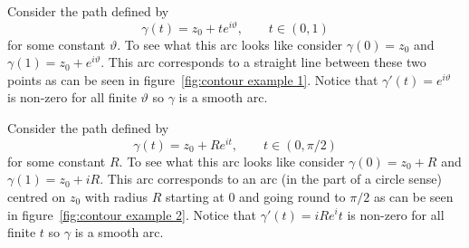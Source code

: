 \documentclass{article}
\begin{document}
    \begin{example}\label{exa:contours}
        Consider the path defined by
        \[\gamma(t) = z_0 + te^{i\vartheta}, \qquad t\in(0, 1)\]
        for some constant \(\vartheta\).
        To see what this arc looks like consider \(\gamma(0) = z_0\) and \(\gamma(1) = z_0 + e^{i\vartheta}\).
        This arc corresponds to a straight line between these two points as can be seen in figure~\ref{fig:contour example 1}.
        Notice that \(\gamma'(t) = e^{i\vartheta}\) is non-zero for all finite \(\vartheta\) so \(\gamma\) is a smooth arc.
        
        Consider the path defined by
        \[\gamma(t) = z_0 + Re^{it}, \qquad t\in(0, \pi/2)\]
        for some constant \(R\).
        To see what this arc looks like consider \(\gamma(0) = z_0 + R\) and \(\gamma(1) = z_0 + iR\).
        This arc corresponds to an arc (in the part of a circle sense) centred on \(z_0\) with radius \(R\) starting at 0 and going round to \(\pi/2\) as can be seen in figure~\ref{fig:contour example 2}.
        Notice that \(\gamma'(t) = iRe^it\) is non-zero for all finite \(t\) so \(\gamma\) is a smooth arc.
        

\end{example}
\end{document}
